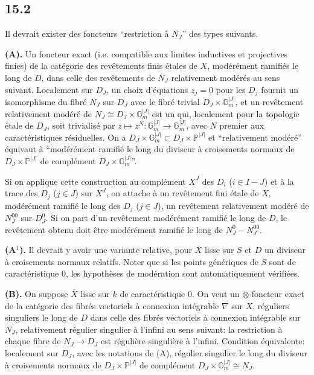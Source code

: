 \documentclass[12pt,a4paper]{article}
\theoremstyle{plain}
\theoremstyle{definition}
\theoremstyle{remark}
\newcommand{\bP}{\mathbb{P}}
\newcommand{\bG}{\mathbb{G}}
\begin{document}
\subsection*{15.2}

Il devrait exister des foncteurs ``restriction à $N_J$'' des types suivants.

\textbf{(A).} Un foncteur exact (i.e. compatible aux limites inductives et projectives finies) de la catégorie des revêtements finis étales de $X$, modérément ramifiés le long de $D$, dans celle des revêtements de $N_J$ relativement modérés au sens suivant. Localement sur $D_J$, un choix d'équations $z_j = 0$ pour les $D_j$ fournit un isomorphisme du fibré $N_J$ sur $D_J$ avec le fibré trivial $D_J \times \bG_m^{|J|}$, et un revêtement relativement modéré de $N_J \cong D_J \times \bG_m^{|J|}$ est un qui, localement pour la topologie étale de $D_J$, soit trivialisé par $z \mapsto z^N: \bG_m^{|J|} \to \bG_m^{|J|}$, avec $N$ premier aux caractéristiques résiduelles. On a $D_J \times \bG_m^{|J|} \subset D_J \times \bP^{|J|}$ et ``relativement modéré'' équivaut à ``modérément ramifié le long du diviseur à croisements normaux de $D_J \times \bP^{|J|}$ de complément $D_J \times \bG_m^{|J|}$''.

Si on applique cette construction au complément $X^J$ des $D_i$ ($i \in I - J$) et à la trace des $D_j$ ($j \in J$) sur $X^J$, on attache à un revêtement fini étale de $X$, modérément ramifié le long des $D_j$ ($j \in J$), un revêtement relativement modéré de $N_J^{00}$ sur $D_J^0$. Si on part d'un revêtement modérément ramifié le long de $D$, le revêtement obtenu doit être modérément ramifié le long de $N_J^0 - N_J^{00}$.

\textbf{(A$^1$).} Il devrait y avoir une variante relative, pour $\overline{X}$ lisse sur $S$ et $D$ un diviseur à croisements normaux relatifs. Noter que si les points génériques de $S$ sont de caractéristique $0$, les hypothèses de modération sont automatiquement vérifiées.

\textbf{(B).} On suppose $\overline{X}$ lisse sur $k$ de caractéristique $0$. On veut un $\otimes$-foncteur exact de la catégorie des fibrés vectoriels à connexion intégrable $\nabla$ sur $X$, réguliers singuliers le long de $D$ dans celle des fibrés vectoriels à connexion intégrable sur $N_J$, relativement régulier singulier à l'infini au sens suivant: la restriction à chaque fibre de $N_J \to D_J$ est régulière singulière à l'infini. Condition équivalente: localement sur $D_J$, avec les notations de (A), régulier singulier le long du diviseur à croisements normaux de $D_J \times \bP^{|J|}$ de complément $D_J \times \bG_m^{|J|} \cong N_J$.
\end{document}
